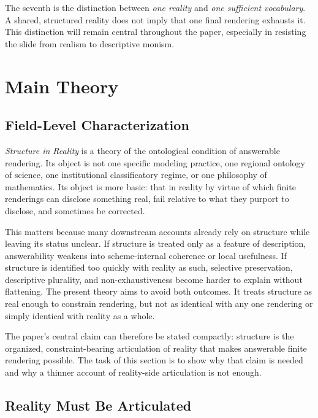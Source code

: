 \documentclass[11pt]{article}
\renewcommand{\emph}[1]{\textit{#1}}
\begin{document}
The seventh is the distinction between \emph{one reality} and \emph{one sufficient vocabulary}. A shared, structured reality does not imply that one final rendering exhausts it. This distinction will remain central throughout the paper, especially in resisting the slide from realism to descriptive monism. \cite{Ludwig2021ScientificPluralismSEP,Massimi2022PerspectivalRealism}

\section{Main Theory}

\subsection{Field-Level Characterization}

\emph{Structure in Reality} is a theory of the ontological condition of answerable rendering. Its object is not one specific modeling practice, one regional ontology of science, one institutional classificatory regime, or one philosophy of mathematics. Its object is more basic: that in reality by virtue of which finite renderings can disclose something real, fail relative to what they purport to disclose, and sometimes be corrected.

This matters because many downstream accounts already rely on structure while leaving its status unclear. If structure is treated only as a feature of description, answerability weakens into scheme-internal coherence or local usefulness. If structure is identified too quickly with reality as such, selective preservation, descriptive plurality, and non-exhaustiveness become harder to explain without flattening. The present theory aims to avoid both outcomes. It treats structure as real enough to constrain rendering, but not as identical with any one rendering or simply identical with reality as a whole. \cite{Chakravartty2011ScientificRealismSEP,FriggNguyen2021ScientificRepresentationSEP}

The paper's central claim can therefore be stated compactly: structure is the organized, constraint-bearing articulation of reality that makes answerable finite rendering possible. The task of this section is to show why that claim is needed and why a thinner account of reality-side articulation is not enough.

\subsection{Reality Must Be Articulated}
\end{document}
